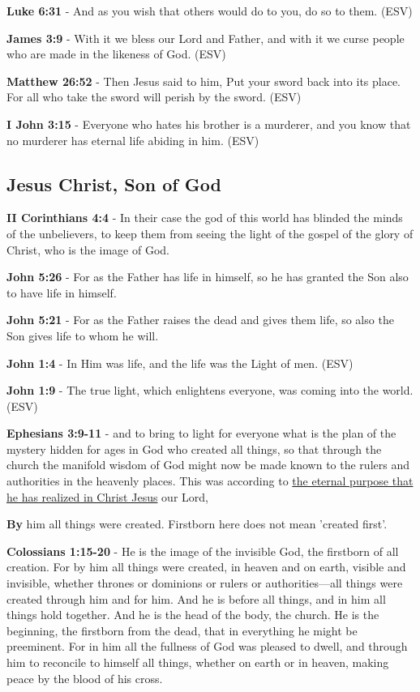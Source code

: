 \documentclass[11pt]{article}
\begin{document}
\textbf{Luke 6:31} - And as you wish that others would do to you, do so to them. (ESV)

\textbf{James 3:9} - With it we bless our Lord and Father, and with it we curse people who are made in the likeness of God. (ESV)

\textbf{Matthew 26:52} - Then Jesus said to him, Put your sword back into its place.  For all who take the sword will perish by the sword. (ESV)

\textbf{I John 3:15} - Everyone who hates his brother is a murderer, and you know that no murderer has eternal life abiding in him. (ESV)

\subsection{Jesus Christ, Son of God}
\label{sec:org08d4316}
\textbf{II Corinthians 4:4} - In their case the god of this world has blinded the minds of the unbelievers, to keep them from seeing the light of the gospel of the glory of Christ, who is the image of God.

\textbf{John 5:26} - For as the Father has life in himself, so he has granted the Son also to have life in himself.

\textbf{John 5:21} - For as the Father raises the dead and gives them life, so also the Son gives life to whom he will.

\textbf{John 1:4} - In Him was life, and the life was the Light of men. (ESV)

\textbf{John 1:9} - The true light, which enlightens everyone, was coming into the world. (ESV)

\textbf{Ephesians 3:9-11} - and to bring to light for everyone what is the plan of the mystery hidden for ages in God who created all things, so that through the church the manifold wisdom of God might now be made known to the rulers and authorities in the heavenly places. This was according to \uline{the eternal purpose that he has realized in Christ Jesus} our Lord,

\textbf{By} him all things were created. Firstborn here does not mean 'created first'.

\textbf{Colossians 1:15-20} - He is the image of the invisible God, the firstborn of all creation. For by him all things were created, in heaven and on earth, visible and invisible, whether thrones or dominions or rulers or authorities—all things were created through him and for him. And he is before all things, and in him all things hold together. And he is the head of the body, the church. He is the beginning, the firstborn from the dead, that in everything he might be preeminent. For in him all the fullness of God was pleased to dwell, and through him to reconcile to himself all things, whether on earth or in heaven, making peace by the blood of his cross.
\end{document}
